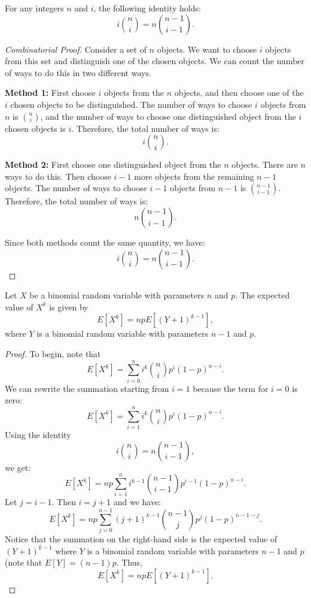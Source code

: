 \begin{lemma}
    For any integers \( n \) and \( i \), the following identity holds:
    \[
    i \binom{n}{i} = n \binom{n-1}{i-1}.
    \]
\end{lemma}

\begin{proof}[Combinatorial Proof]
    Consider a set of \( n \) objects. We want to choose \( i \) objects from this set and distinguish one of the chosen objects. We can count the number of ways to do this in two different ways.

    \textbf{Method 1:} First choose \( i \) objects from the \( n \) objects, and then choose one of the \( i \) chosen objects to be distinguished. The number of ways to choose \( i \) objects from \( n \) is \( \binom{n}{i} \), and the number of ways to choose one distinguished object from the \( i \) chosen objects is \( i \). Therefore, the total number of ways is:
    \[
    i \binom{n}{i}.
    \]

    \textbf{Method 2:} First choose one distinguished object from the \( n \) objects. There are \( n \) ways to do this. Then choose \( i-1 \) more objects from the remaining \( n-1 \) objects. The number of ways to choose \( i-1 \) objects from \( n-1 \) is \( \binom{n-1}{i-1} \). Therefore, the total number of ways is:
    \[
    n \binom{n-1}{i-1}.
    \]

    Since both methods count the same quantity, we have:
    \[
    i \binom{n}{i} = n \binom{n-1}{i-1}.
    \]
\end{proof}

\begin{theorem}
    Let \( X \) be a binomial random variable with parameters \( n \) and \( p \). The expected value of \( X^k \) is given by
    \[
    E[X^k] = npE[(Y + 1)^{k-1}],
    \]
    where \( Y \) is a binomial random variable with parameters \( n-1 \) and \( p \).
\end{theorem}

\begin{proof}
    To begin, note that
    \[
    E[X^k] = \sum_{i=0}^n i^k \binom{n}{i} p^i (1 - p)^{n-i}.
    \]
    We can rewrite the summation starting from \( i = 1 \) because the term for \( i = 0 \) is zero:
    \[
    E[X^k] = \sum_{i=1}^n i^k \binom{n}{i} p^i (1 - p)^{n-i}.
    \]
    Using the identity
    \[
    i \binom{n}{i} = n \binom{n-1}{i-1},
    \]
    we get:
    \[
    E[X^k] = np \sum_{i=1}^n i^{k-1} \binom{n-1}{i-1} p^{i-1} (1 - p)^{n-i}.
    \]
    Let \( j = i - 1 \). Then \( i = j + 1 \) and we have:
    \[
    E[X^k] = np \sum_{j=0}^{n-1} (j+1)^{k-1} \binom{n-1}{j} p^j (1 - p)^{n-1-j}.
    \]
    Notice that the summation on the right-hand side is the expected value of \( (Y + 1)^{k-1} \) where \( Y \) is a binomial random variable with parameters \( n-1 \) and \( p \) (note that $E[Y] = (n-1)p$. Thus,
    \[
    E[X^k] = np E[(Y + 1)^{k-1}].
    \]
\end{proof}


